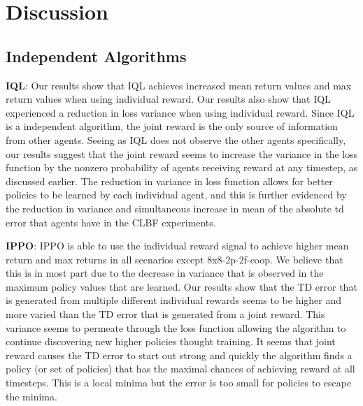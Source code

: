 \documentclass[systems,article,submit,pdftex,moreauthors]{Definitions/mdpi}
\begin{document}
\section{Discussion}
\label{sec:Discussion}

\subsection{Independent Algorithms}

\textbf{IQL}: 
Our results show that IQL achieves increased mean return values and max return values when using individual reward. Our results also show that IQL experienced a reduction in loss variance when using individual reward. Since IQL is a independent algorithm, the joint reward is the only source of information from other agents. Seeing as IQL does not observe the other agents specifically, our results suggest that the joint reward seems to increase the variance in the loss function by the nonzero probability of agents receiving reward at any timestep, as discussed earlier. The reduction in variance in loss function allows for better policies to be learned by each individual agent, and this is further evidenced by the reduction in variance and simultaneous increase in mean of the absolute td error that agents have in the CLBF experiments.

\textbf{IPPO}:
IPPO is able to use the individual reward signal to achieve higher mean return and max returns in all scenarios except 8x8-2p-2f-coop. We believe that this is in most part due to the decrease in variance that is observed in the maximum policy values that are learned. Our results show that the TD error that is generated from multiple different individual rewards seems to be higher and more varied than the TD error that is generated from a joint reward. This variance seems to permeate through the loss function allowing the algorithm to continue discovering new higher policies thought training. It seems that joint reward causes the TD error to start out strong and quickly the algorithm finds a policy (or set of policies) that has the maximal chances of achieving reward at all timesteps. This is a local minima but the error is too small for policies to escape the minima. 
\end{document}
